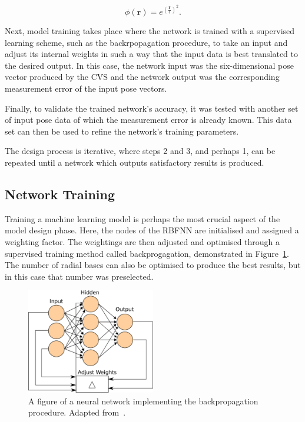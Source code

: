 \begin{equation}
  \phi(\bm{r}) = e^{(\frac{\bm{r}}{\epsilon})^2}.
\end{equation}

Next, model training takes place where the network is trained with a supervised learning scheme, such as the backrpopagation procedure, to take an input and adjust its internal weights in such a way that the input data is best translated to the desired output. In this case, the network input was the six-dimensional pose vector produced by the CVS and the network output was the corresponding measurement error of the input pose vectors.  

Finally, to validate the trained network's accuracy, it was tested with another set of input pose data of which the measurement error is already known. This data set can then be used to refine the network's training parameters. 

The design process is iterative, where steps 2 and 3, and perhaps 1, can be repeated until a network which outputs satisfactory results is produced. 

\subsection{Network Training}

Training a machine learning model is perhaps the most crucial aspect of the model design phase. Here, the nodes of the RBFNN are initialised and assigned a weighting factor. The weightings are then adjusted and optimised through a supervised training method called backprogagation, demonstrated in Figure~\ref{fig:chap4-backprogagation}. The number of radial bases can also be optimised to produce the best results, but in this case that number was preselected. 

\begin{figure}
  \centering
  \includegraphics[width=0.5\textwidth]{figures/chapter4/backpropagation}
  \caption[Neural network implementing the backpropagation procedure.]{A figure of a neural network implementing the backpropagation procedure. Adapted from~\cite{ann-wiki-pic}.}
\label{fig:chap4-backprogagation}
\end{figure}

